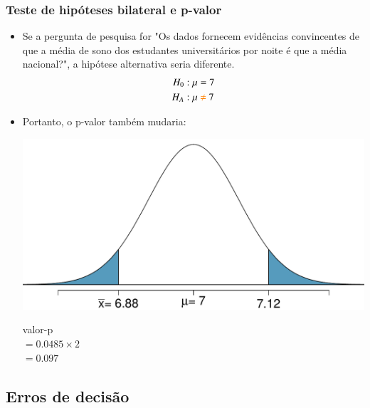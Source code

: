 \begin{frame}
\frametitle{Teste de hipóteses bilateral e p-valor}

\begin{itemize}
\justifying
\item Se a pergunta de pesquisa for "Os dados fornecem evidências convincentes de que a média de sono dos estudantes universitários por noite é  que a média nacional?", a hipótese alternativa seria diferente.
\begin{align*}
H_0&: \mu = 7 \\
H_A&: \mu \textit{\textcolor{orange}{~$\ne$~}} 7
\end{align*}

\pause
\justifying
\item Portanto, o p-valor também mudaria:
{
\begin{center}
\includegraphics[width=\textwidth]{4-3_hyp_test/sleep_pval_ts.pdf}
\end{center}
}
{
\small{valor-p \\
$= 0.0485 \times 2$ \\
$= 0.097$
}}

\end{itemize}

\end{frame}


\subsection{Erros de decisão}


